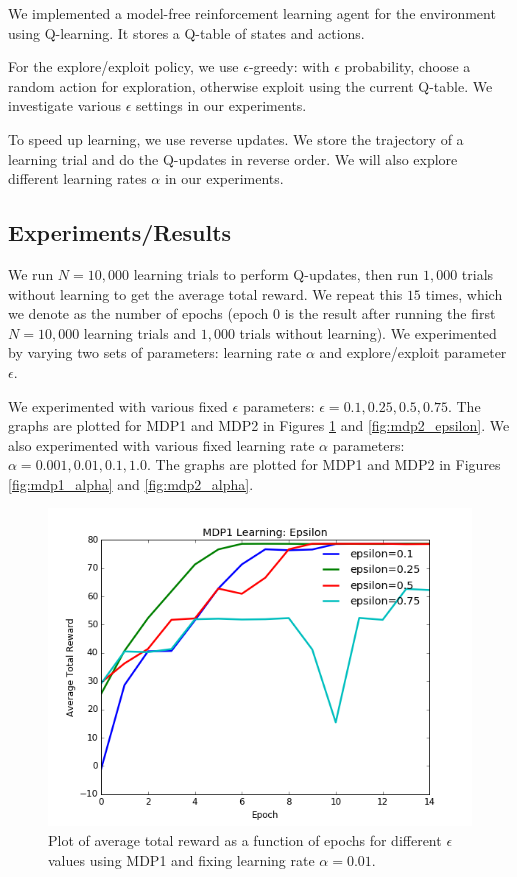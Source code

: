 \documentclass[paper=a4, fontsize=11pt]{scrartcl}
\begin{document}
We implemented a model-free reinforcement learning agent for the environment using Q-learning. It stores a Q-table of states and actions.

For the explore/exploit policy, we use $\epsilon$-greedy: with $\epsilon$ probability, choose a random action for exploration, otherwise exploit using the current Q-table. We investigate various $\epsilon$ settings in our experiments.

To speed up learning, we use reverse updates. We store the trajectory of a learning trial and do the Q-updates in reverse order. We will also explore different learning rates $\alpha$ in our experiments.

\subsection{Experiments/Results}

We run $N=10,000$ learning trials to perform Q-updates, then run $1,000$ trials without learning to get the average total reward. We repeat this $15$ times, which we denote as the number of epochs (epoch 0 is the result after running the first $N=10,000$ learning trials and $1,000$ trials without learning). We experimented by varying two sets of parameters: learning rate $\alpha$ and explore/exploit parameter $\epsilon$.

We experimented with various fixed $\epsilon$ parameters: $\epsilon=0.1,0.25,0.5,0.75$. The graphs are plotted for MDP1 and MDP2 in Figures \ref{fig:mdp1_epsilon} and \ref{fig:mdp2_epsilon}. We also experimented with various fixed learning rate $\alpha$ parameters: $\alpha=0.001, 0.01,0.1,1.0$. The graphs are plotted for MDP1 and MDP2 in Figures \ref{fig:mdp1_alpha} and \ref{fig:mdp2_alpha}.

\begin{figure}
\centering
	\includegraphics[width=.8\linewidth]{mdp1_epsilon_plot.png}
\caption{Plot of average total reward as a function of epochs for different $\epsilon$ values using MDP1 and fixing learning rate $\alpha=0.01$.}
\label{fig:mdp1_epsilon}
\end{figure}
\end{document}
